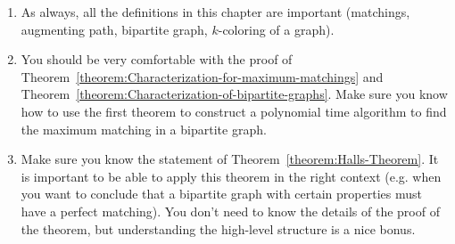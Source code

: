 \begin{enumerate}
    \item As always, all the definitions in this chapter are important (matchings, augmenting path, bipartite graph, $k$-coloring of a graph).
    \item You should be very comfortable with the proof of Theorem~\ref{theorem:Characterization-for-maximum-matchings} and Theorem~\ref{theorem:Characterization-of-bipartite-graphs}. Make sure you know how to use the first theorem to construct a polynomial time algorithm to find the maximum matching in a bipartite graph.
    \item Make sure you know the statement of Theorem~\ref{theorem:Halls-Theorem}. It is important to be able to apply this theorem in the right context (e.g. when you want to conclude that a bipartite graph with certain properties must have a perfect matching). You don't need to know the details of the proof of the theorem, but understanding the high-level structure is a nice bonus.
\end{enumerate}

